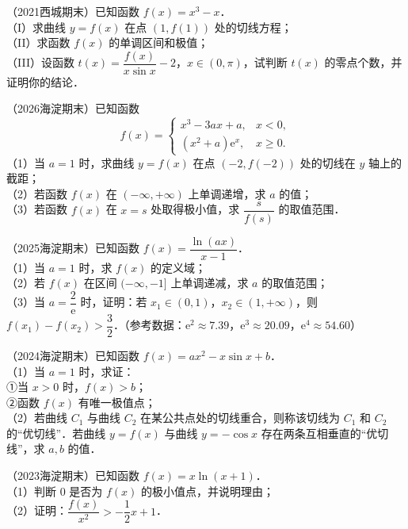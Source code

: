 \begin{example}
（2021西城期末）已知函数 $f(x)=x^3-x$．\\
（I）求曲线 $y=f(x)$ 在点 $(1,f(1))$ 处的切线方程；\\
（II）求函数 $f(x)$ 的单调区间和极值；\\
（III）设函数 $t(x)=\dfrac{f(x)}{x\sin x}-2$，$x\in(0,\pi)$，试判断 $t(x)$ 的零点个数，并证明你的结论．
\end{example}

\begin{example}
（2026海淀期末）已知函数
\[
f(x)=
\begin{cases}
x^3-3ax+a,&x<0,\\
(x^2+a)\mathrm{e}^x,&x\geqslant0.
\end{cases}
\]
（1）当 $a=1$ 时，求曲线 $y=f(x)$ 在点 $(-2,f(-2))$ 处的切线在 $y$ 轴上的截距；\\
（2）若函数 $f(x)$ 在 $(-\infty,+\infty)$ 上单调递增，求 $a$ 的值；\\
（3）若函数 $f(x)$ 在 $x=s$ 处取得极小值，求 $\dfrac{s}{f(s)}$ 的取值范围．
\end{example}

\begin{example}
（2025海淀期末）已知函数 $f(x)=\dfrac{\ln(ax)}{x-1}$．\\
（1）当 $a=1$ 时，求 $f(x)$ 的定义域；\\
（2）若 $f(x)$ 在区间 $(-\infty,-1]$ 上单调递减，求 $a$ 的取值范围；\\
（3）当 $a=\dfrac{2}{\mathrm{e}}$ 时，证明：若 $x_1\in(0,1)$，$x_2\in(1,+\infty)$，则 $f(x_1)-f(x_2)>\dfrac32$．（参考数据：$\mathrm{e}^2\approx7.39$，$\mathrm{e}^3\approx20.09$，$\mathrm{e}^4\approx54.60$）
\end{example}

\begin{example}
（2024海淀期末）已知函数 $f(x)=ax^2-x\sin x+b$．\\
（1）当 $a=1$ 时，求证：\\
①当 $x>0$ 时，$f(x)>b$；\\
②函数 $f(x)$ 有唯一极值点；\\
（2）若曲线 $C_1$ 与曲线 $C_2$ 在某公共点处的切线重合，则称该切线为 $C_1$ 和 $C_2$ 的“优切线”．若曲线 $y=f(x)$ 与曲线 $y=-\cos x$ 存在两条互相垂直的“优切线”，求 $a,b$ 的值．
\end{example}

\begin{example}
（2023海淀期末）已知函数 $f(x)=x\ln(x+1)$．\\
（1）判断 $0$ 是否为 $f(x)$ 的极小值点，并说明理由；\\
（2）证明：$\dfrac{f(x)}{x^2}>-\dfrac12x+1$．
\end{example}


